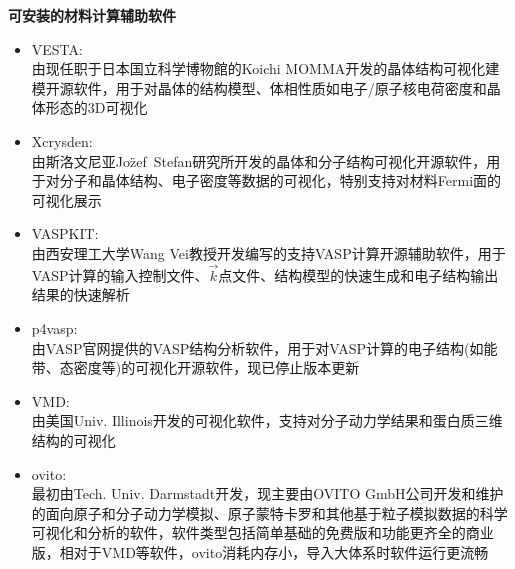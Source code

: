 \newpage
\textbf{可安装的材料计算辅助软件}
\begin{itemize}
	\item \textrm{VESTA}:\\
		由现任职于日本国立科学博物館的\textrm{Koichi MOMMA}开发的晶体结构可视化建模开源软件，用于对晶体的结构模型、体相性质如电子/原子核电荷密度和晶体形态的\textrm{3D}可视化
	\item \textrm{Xcrysden}:\\
		由斯洛文尼亚\textrm{Jo\"zef~Stefan}研究所开发的晶体和分子结构可视化开源软件，用于对分子和晶体结构、电子密度等数据的可视化，特别支持对材料\textrm{Fermi}面的可视化展示
	\item \textrm{VASPKIT}:\\
		由西安理工大学\textrm{Wang Vei}教授开发编写的支持\textrm{VASP}计算开源辅助软件，用于\textrm{VASP}计算的输入控制文件、$\vec k$点文件、结构模型的快速生成和电子结构输出结果的快速解析
	\item \textrm{p4vasp}:\\
		由\textrm{VASP}官网提供的\textrm{VASP}结构分析软件，用于对\textrm{VASP}计算的电子结构(如能带、态密度等)的可视化开源软件，现已停止版本更新
	\item \textrm{VMD}:\\
		由美国\textrm{Univ. Illinois}开发的可视化软件，支持对分子动力学结果和蛋白质三维结构的可视化 
	\item \textrm{ovito}:\\
		最初由\textrm{Tech. Univ. Darmstadt}开发，现主要由\textrm{OVITO GmbH}公司开发和维护的面向原子和分子动力学模拟、原子蒙特卡罗和其他基于粒子模拟数据的科学可视化和分析的软件，软件类型包括简单基础的免费版和功能更齐全的商业版，相对于\textrm{VMD}等软件，\textrm{ovito}消耗内存小，导入大体系时软件运行更流畅
\end{itemize}
